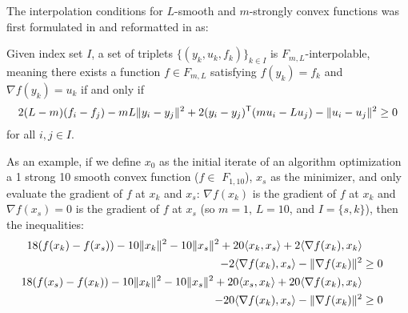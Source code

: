 The interpolation conditions for $L$-smooth and $m$-strongly convex functions was first formulated in \cite{taylor2016} and reformatted in \cite{tutorial} as:

\begin{theorem}
	\label{thm:interpolation_condition}
	Given index set \(I\), a set of triplets \(\{(y_k, u_k, f_k)\}_{k \in I}\) is $F_{m,L}$-interpolable, meaning there exists a function \(f \in F_{m,L}\) satisfying \(f(y_k) = f_k\) and \(\nabla f(y_k) = u_k\) if and only if
	\[
	 	2(L-m)(f_i - f_j) - mL\|y_i - y_j\|^2 + 2(y_i - y_j)^{\mathsf{T}} (mu_i - Lu_j) - \|u_i - u_j\|^2 \geq 0
	\]
	for all $i,j\in I$.
\end{theorem}

As an example, if we define $x_0$ as the initial iterate of an algorithm optimization a 1 strong 10 smooth convex function (\(f \in \) \(F_{1,10}\)), $x_s$ as the minimizer, and only evaluate the gradient of $f$ at $x_k$ and $x_s$: $\nabla f(x_k)$ is the gradient of $f$ at $x_k$ and $\nabla f(x_s) = 0$ is the gradient of $f$ at $x_s$ (so $m=1$, $L=10$, and $I = \{s,k\}$), then the inequalities:
\begin{equation} \label{eqn:int_cond}
	\begin{split}
		18(f(x_k)-f(x_s))-10\|x_k\|^2 -10\|x_s\|^2 + 20\langle x_k, x_s \rangle + 2\langle \nabla f(x_k), x_k \rangle \\
		- 2\langle \nabla f(x_k), x_s \rangle - \|\nabla f(x_k)\|^2 &\geq 0      \\
		18(f(x_s)-f(x_k))-10\|x_k\|^2 -10\|x_s\|^2 + 20\langle x_s, x_k \rangle + 20\langle \nabla f(x_k), x_k \rangle \\
		- 20\langle \nabla f(x_k), x_s \rangle - \|\nabla f(x_k)\|^2 &\geq 0
	\end{split}
\end{equation}
